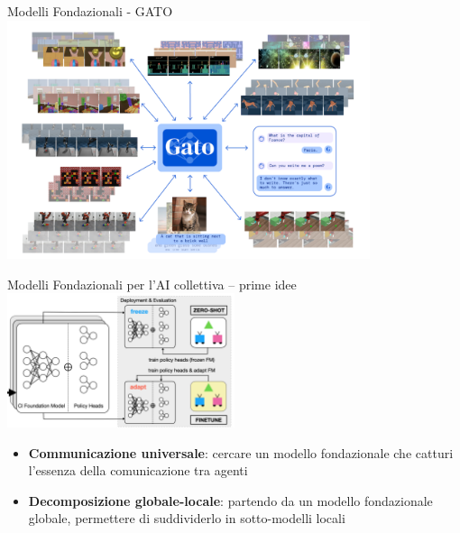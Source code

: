 \documentclass[presentation, 10pt,aspectratio=169]{beamer}\mode<presentation>{\usetheme{AMSBolognaFC}}
\begin{document}
\begin{frame}{Modelli Fondazionali - GATO}
	\centering
	\includegraphics[height=7cm]{img/gato.png}
\end{frame}
\begin{frame}{Modelli Fondazionali per l'AI collettiva -- prime idee}
\centering
\includegraphics[width=0.5\textwidth]{img/ci.png}
\begin{itemize}
	\item \textbf{Communicazione universale}: cercare un modello fondazionale che catturi l'essenza della comunicazione tra agenti
	\item \textbf{Decomposizione globale-locale}: partendo da un modello fondazionale globale, permettere di suddividerlo in sotto-modelli locali
\end{itemize}
\end{frame}
\end{document}
